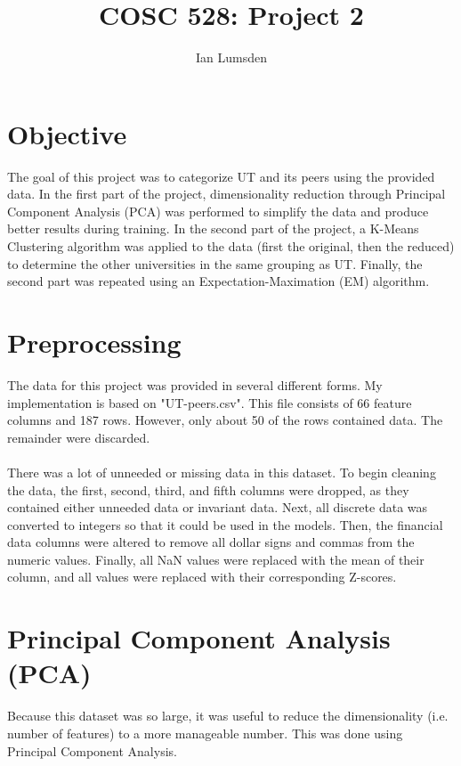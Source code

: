 \documentclass[12pt]{article}
\title{COSC 528: Project 2}
\author{Ian Lumsden}
\begin{document}
	\maketitle
	\newpage
	
	\section{Objective}
	The goal of this project was to categorize UT and its peers using the provided data. In the first part of the project, dimensionality reduction through Principal Component Analysis (PCA) was performed to simplify the data and produce better results during training. In the second part of the project, a K-Means Clustering algorithm was applied to the data (first the original, then the reduced) to determine the other universities in the same grouping as UT. Finally, the second part was repeated using an Expectation-Maximation (EM) algorithm.
	
	\section{Preprocessing}
	The data for this project was provided in several different forms. My implementation is based on "UT-peers.csv". This file consists of 66 feature columns and 187 rows. However, only about 50 of the rows contained data. The remainder were discarded.
	\paragraph{}
	There was a lot of unneeded or missing data in this dataset. To begin cleaning the data, the first, second, third, and fifth columns were dropped, as they contained either unneeded data or invariant data. Next, all discrete data was converted to integers so that it could be used in the models. Then, the financial data columns were altered to remove all dollar signs and commas from the numeric values. Finally, all NaN values were replaced with the mean of their column, and all values were replaced with their corresponding Z-scores.
	
	\section{Principal Component Analysis (PCA)}
	Because this dataset was so large, it was useful to reduce the dimensionality (i.e. number of features) to a more manageable number. This was done using Principal Component Analysis.
\end{document}
